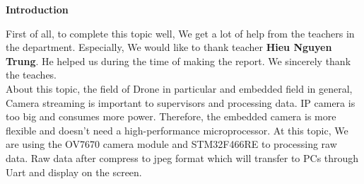 \documentclass[D:/Latex/Internship/Report/Latex/Report.tex]{subfiles}
\begin{document}
	\begin{center}
	\Large \textbf{Introduction}
	\end{center}
	\vspace{1cm}
	First of all, to complete this topic well, We get a lot of help from the teachers in the department.
	Especially, We would like to thank teacher \textbf{Hieu Nguyen Trung}. He helped us during the time
	of making the report. We sincerely thank the teaches.	\\	
	\doublespacing
	About this topic, the field of Drone in particular and embedded field in general, Camera streaming
	 is important to supervisors and processing data. IP camera is too big and consumes more power. 
	 Therefore, the embedded camera is more flexible and doesn't need a high-performance microprocessor. 
	 At this topic, We are using the OV7670 camera module and STM32F466RE to processing raw data. Raw data
	 after compress to jpeg format which will transfer to PCs through Uart and display on the screen.
\end{document}
